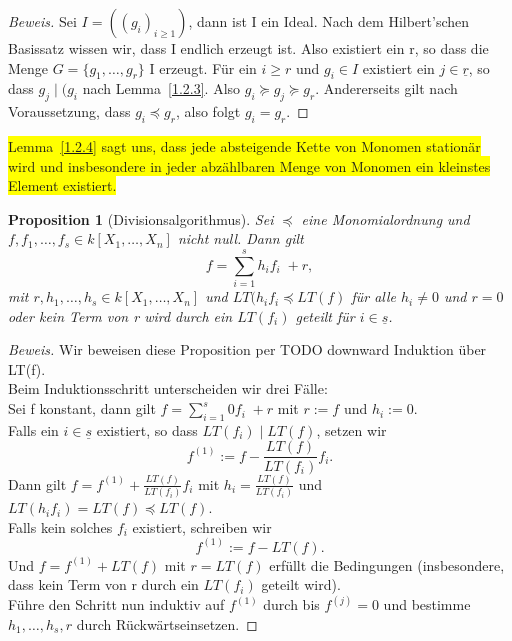 \documentclass{article}
\newtheorem{proposition}[satz]{Proposition}
\newcommand*{\R}{k[X_{1},\ldots,X_{n}]}
\begin{document}
	\begin{proof}[Beweis]
	Sei \(I = ((g_{i})_{i \geq 1})\), dann ist I ein Ideal. Nach dem Hilbert'schen Basissatz
	wissen wir, dass I endlich erzeugt ist. Also existiert ein r, so dass die Menge \(G = \{g_{1},
	\ldots, g_{r}\}\) I erzeugt. Für ein \(i \geq r\) und \(g_{i} \in I\) existiert ein
	\(j \in \underline{r}\), so dass \(g_{j}\; | \;(g_{i}\) nach Lemma~\ref{1.2.3}. Also \(g_{i}
	\succeq g_{j} \succeq g_{r}\). Andererseits gilt nach Voraussetzung, dass \(g_{i} \preceq g_{r}
	\), also folgt \(g_{i} = g_{r}\).
	\end{proof}


	\colorbox{yellow}{Lemma~\ref{1.2.4} sagt uns, dass jede absteigende Kette von Monomen stationär wird und insbesondere in jeder abzählbaren Menge von Monomen ein kleinstes Element existiert.}
	

	\begin{proposition}[Divisionsalgorithmus] \label{1.2.5}
	Sei \(\preceq\) eine Monomialordnung und \(f, f_{1}, \ldots, f_{s} \in \R\) nicht null. Dann
	gilt \begin{displaymath} f = \sum_{i=1}^{s} h_{i}f_{i}\; + r, \end{displaymath} mit
	\(r, h_{1}, \ldots, h_{s} \in \R\) und \(LT(h_{i}f_{i} \preceq LT(f)\) für alle \(h_{i} \neq 0
	\) und \(r = 0\) oder kein Term von r wird durch ein \(LT(f_{i})\) geteilt für \(i \in
	\underline{s}\).
	\end{proposition}

	\begin{proof}[Beweis]
	Wir beweisen diese Proposition per TODO downward Induktion über LT(f). \\
	Beim Induktionsschritt unterscheiden wir drei Fälle:\\
	Sei f konstant, dann gilt \(f = \sum_{i=1}^{s} 0f_{i}\; + r\) mit \(r := f\) und \(h_{i} := 0\). \\
	Falls ein \(i \in \underline{s}\) existiert, so dass \(LT(f_{i})\;| \; LT(f)\), setzen wir
	\begin{displaymath} f^{(1)} := f - \frac{LT(f)}{LT(f_{i})}f_{i}.\end{displaymath} Dann gilt
	\( f = f^{(1)} + \frac{LT(f)}{LT(f_{i})}f_{i} \) mit \(h_{i} = \frac{LT(f)}{LT(f_{i})}\) und 
	\(LT(h_{i}f_{i}) = LT(f) \preceq LT(f).\) \\
	Falls kein solches \(f_{i}\) existiert, schreiben wir \begin{displaymath} f^{(1)} := f -
	LT(f). \end{displaymath} Und \(f = f^{(1)} + LT(f)\) mit \(r = LT(f)\) erfüllt die Bedingungen 
	(insbesondere, dass kein Term von r durch ein \(LT(f_{i})\) geteilt wird). \\
	Führe den Schritt nun induktiv auf \(f^{(1)}\) durch bis \(f^{(j)} = 0\) und bestimme
	\(h_{1}, \ldots, h_{s}, r\) durch Rückwärtseinsetzen.
	\end{proof}
\end{document}
